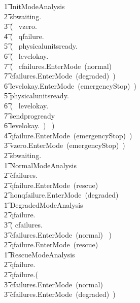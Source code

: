 \documentclass{report} %
\begin{document}
\begin{circusaction}
        \t1 InitModeAnalysis \circdef \\ 
            \t2 sbwaiting.\true \then \\
                \t3 (~ vzero.\true \then \\
                    \t4 (~ qfailure.\false \then \\
                        \t5 (~ physicalunitsready.\true \then \\
                                \t6 (~ levelokay.\true \then \\
                                    \t7 (~ cfailures.\false \then EnterMode~(normal) \extchoice \\
                                    \t7 cfailures.\true \then EnterMode~(degraded)~) \extchoice \\
                                 \t6  levelokay.\false \then EnterMode~(emergencyStop)~) \extchoice \\
                        \t5 physicalunitsready.\false \then \\
                                \t6 (~ levelokay.\true \then \\
                                    \t7 sendprogready \then \Skip \extchoice \\
                                \t6 levelokay.\false \then \Skip~) ~) \extchoice \\
                     \t4 qfailure.\true \then EnterMode~(emergencyStop)~) \extchoice \\
                \t3 vzero.\false \then EnterMode~(emergencyStop)~) \extchoice\\
            \t2 sbwaiting.\false \then \Skip \\
        \t1 NormalModeAnalysis \circdef \\
            \t2 cfailures.\false \then \Skip \extchoice \\
            \t2 qfailure.\true \then EnterMode~(rescue) \extchoice \\
            \t2 nonqfailure.\true \then EnterMode~(degraded) \\
        \t1 DegradedModeAnalysis \circdef \\
            \t2 qfailure.\false \then \\
                \t3 ( cfailures.\true \then \Skip \extchoice \\
                \t3 cfailures.\false \then EnterMode~(normal) ~) \\
            \t2 \extchoice qfailure.\true \then EnterMode~(rescue) \\
        \t1 RescueModeAnalysis \circdef \\
            \t2 qfailure.\true \then \Skip \extchoice \\
            \t2 qfailure.\false \then ( \\
                \t3 cfailures.\false \then EnterMode~(normal) \\
                \t3 \extchoice cfailures.\true \then EnterMode~(degraded)~) \\
\end{circusaction}
\end{document}

